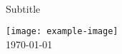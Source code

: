 \begin{titlingpage}
\begin{center}
\vspace*{2cm}\noindent

\Huge \textbf{  \DocMainTitle  }
\\[0.6cm]

{\LARGE  Subtitle }
\vspace*{3cm}\par\noindent

\textbf{  \DocAuthors  }
\vfill

\texttt{[image: example-image]}
\\[1.5cm]

\Large
\deprecatedEnvTravisTag
\today

\end{center}
\end{titlingpage}